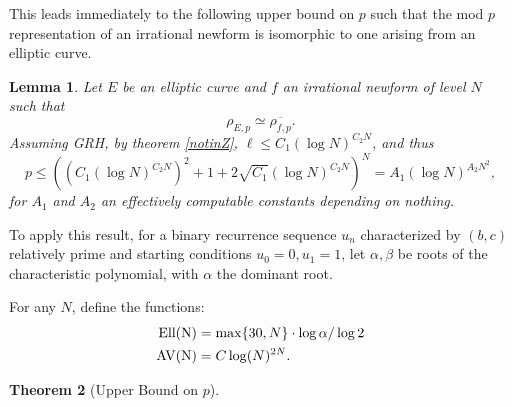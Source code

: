 \documentclass[12pt]{amsart}
\newtheorem{thm}{Theorem}[section]
\newtheorem{lem}[thm]{Lemma}
\theoremstyle{definition}
\renewcommand{\bar}{\overline}
\newcommand{\Ell}{\rm Ell}
\newcommand{\AV}{\rm AV}
\begin{document}
This leads immediately to the following upper bound on $p$ such that the mod $p$ representation of an irrational newform is isomorphic to one arising from an elliptic curve.

\begin{lem}
Let $E$ be an elliptic curve and $f$ an irrational newform of level $N$ such that 
\[\rho_{E,p} \simeq \bar{\rho_{f,p}}.\]
Assuming GRH, by theorem \ref{notinZ}, $\ell \leq C_1 \left( \log{N} \right)^{C_2N}$, and thus
\[ p \leq \left( \left(C_1 \left( \log{N} \right)^{C_2N}\right)^2 + 1 + 2 \sqrt{C_1} \left( \log{N} \right)^{C_2N}\right)^N = A_1 \left( \log{N} \right)^{A_2N^2}, \]
for $A_1$ and $A_2$ an effectively computable constants depending on nothing.
\end{lem}

To apply this result, for a binary recurrence sequence $u_n$ characterized by $(b,c)$ relatively prime and starting conditions $u_0=0,u_1=1$, let $\alpha,\beta$ be roots of the characteristic polynomial, with $\alpha$ the dominant root.  

For any $N$, define the functions:
\begin{align*}
\Ell(N) & = \max\{30, N\} \cdot \log{\alpha}/\log{2} \\
\AV(N) & = C\log(N)^{2N}. 
\end{align*}


\begin{thm}[Upper Bound on $p$]

\end{thm}
\end{document}
